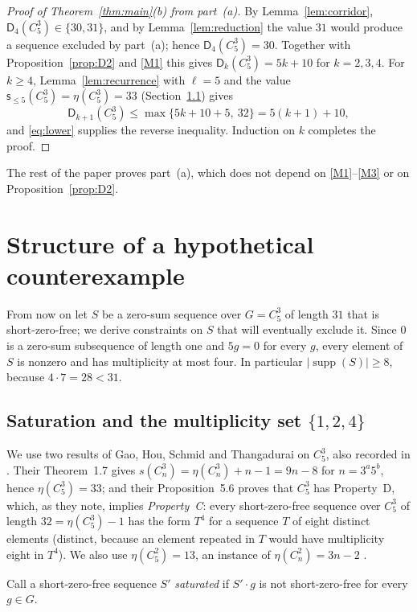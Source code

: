 \documentclass[11pt]{article}
\theoremstyle{definition}
\theoremstyle{remark}
\newcommand{\Dk}{\mathsf{D}}
\newcommand{\C}{C_5^{3}}
\newcommand{\supp}{\operatorname{supp}}
\newcommand{\sle}[1]{\mathsf{s}_{\le #1}}
\begin{document}
\begin{proof}[Proof of Theorem~\ref{thm:main}(b) from part~(a)]
By Lemma~\ref{lem:corridor}, $\Dk_4(\C)\in\{30,31\}$, and by Lemma~\ref{lem:reduction} the value $31$ would produce a sequence excluded by part~(a); hence $\Dk_4(\C)=30$. Together with Proposition~\ref{prop:D2} and \ref{M1} this gives $\Dk_k(\C)=5k+10$ for $k=2,3,4$. For $k\ge4$, Lemma~\ref{lem:recurrence} with $\ell=5$ and the value $\sle{5}(\C)=\eta(\C)=33$ (Section~\ref{subsec:saturation}) gives
\[
\Dk_{k+1}(\C)\le\max\{5k+10+5,\ 32\}=5(k+1)+10,
\]
and \eqref{eq:lower} supplies the reverse inequality. Induction on $k$ completes the proof.
\end{proof}

The rest of the paper proves part~(a), which does not depend on \ref{M1}--\ref{M3} or on Proposition~\ref{prop:D2}.

\section{Structure of a hypothetical counterexample}\label{sec:obstruction}

From now on let $S$ be a zero-sum sequence over $G=\C$ of length $31$ that is short-zero-free; we derive constraints on $S$ that will eventually exclude it. Since $0$ is a zero-sum subsequence of length one and $5g=0$ for every $g$, every element of $S$ is nonzero and has multiplicity at most four. In particular $|\supp(S)|\ge8$, because $4\cdot7=28<31$.

\subsection{Saturation and the multiplicity set $\{1,2,4\}$}\label{subsec:saturation}

We use two results of Gao, Hou, Schmid and Thangadurai \cite{GaoHouSchmidThangadurai2007} on $\C$, also recorded in \cite[Lemma~4.2]{FanGaoWangZhongZhuang2012}. Their Theorem~1.7 gives $s(C_n^3)=\eta(C_n^3)+n-1=9n-8$ for $n=3^a5^b$, hence $\eta(\C)=33$; and their Proposition~5.6 proves that $\C$ has Property~D, which, as they note, implies \emph{Property~C}: every short-zero-free sequence over $\C$ of length $32=\eta(\C)-1$ has the form $T^4$ for a sequence $T$ of eight distinct elements (distinct, because an element repeated in $T$ would have multiplicity eight in $T^4$). We also use $\eta(C_5^2)=13$, an instance of $\eta(C_n^2)=3n-2$ \cite{GaoGeroldinger2006}.

Call a short-zero-free sequence $S'$ \emph{saturated} if $S'\cdot g$ is not short-zero-free for every $g\in G$.
\end{document}
